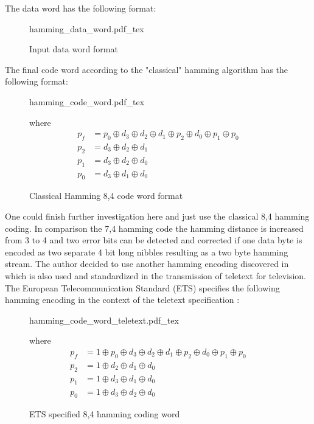 The data word has the following format:

\begin{figure}[H]
\centering
{hamming_data_word.pdf_tex}
\caption{Input data word format}
\end{figure}

The final code word according to the "classical" hamming algorithm has the following format:

\begin{figure}[H]
\begin{center}
{hamming_code_word.pdf_tex}
\end{center}
where
\begin{align*}
p_f &= p_0 \oplus d_3 \oplus d_2 \oplus d_1 \oplus p_2 \oplus d_0 \oplus p_1 \oplus p_0 \\
p_2 &= d_3 \oplus d_2 \oplus d_1 \\
p_1 &= d_3 \oplus d_2 \oplus d_0 \\
p_0 &= d_3 \oplus d_1 \oplus d_0
\end{align*}
\caption{Classical Hamming 8,4 code word format}
\end{figure}

One could finish further investigation here and just use the classical 8,4 hamming coding. In comparison the 7,4 hamming code the hamming distance is increased from 3 to 4 and two error bits can be detected and corrected if one data byte is encoded as two separate 4 bit long nibbles resulting as a two byte hamming stream. The author decided to use another hamming encoding discovered in \cite{stahl} which is also used and standardized in the transmission of teletext for television. The European Telecommunication Standard (ETS) specifies the following hamming encoding in the context of the teletext specification \cite{ets}:

\begin{figure}[H]
\begin{center}
{hamming_code_word_teletext.pdf_tex}
\end{center}
where
\begin{align*}
p_f &= 1 \oplus p_0 \oplus d_3 \oplus d_2 \oplus d_1 \oplus p_2 \oplus d_0 \oplus p_1 \oplus p_0 \\
p_2 &= 1 \oplus d_2 \oplus d_1 \oplus d_0 \\
p_1 &= 1 \oplus d_3 \oplus d_1 \oplus d_0 \\
p_0 &= 1 \oplus d_3 \oplus d_2 \oplus d_0
\end{align*}
\caption{ETS specified 8,4 hamming coding word}
\end{figure}

